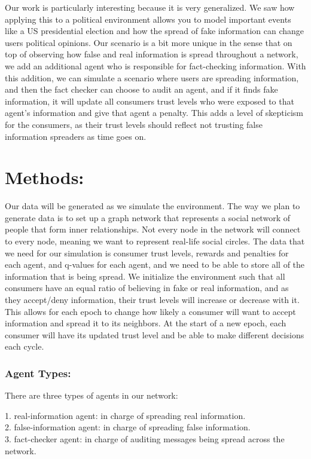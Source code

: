 \documentclass[twoside]{article}
\begin{document}
Our work is particularly interesting because it is very generalized. We saw how applying this to a political environment allows you to model important events like a US presidential election and how the spread of fake information can change users political opinions. Our scenario is a bit more unique in the sense that on top of observing how false and real information is spread throughout a network, we add an additional agent who is responsible for fact-checking information. With this addition, we can simulate a scenario where users are spreading information, and then the fact checker can choose to audit an agent, and if it finds fake information, it will update all consumers trust levels who were exposed to that agent's information and give that agent a penalty. This adds a level of skepticism for the consumers, as their trust levels should reflect not trusting false information spreaders as time goes on.

\section{Methods: }
Our data will be generated as we simulate the environment. The way we plan to generate data is to set up a graph network that represents a social network of people that form inner relationships. Not every node in the network will connect to every node, meaning we want to represent real-life social circles. The data that we need for our simulation is consumer trust levels, rewards and penalties for each agent, and q-values for each agent, and we need to be able to store all of the information that is being spread. We initialize the environment such that all consumers have an equal ratio of believing in fake or real information, and as they accept/deny information, their trust levels will increase or decrease with it. This allows for each epoch to change how likely a consumer will want to accept information and spread it to its neighbors. At the start of a new epoch, each consumer will have its updated trust level and be able to make different decisions each cycle.

\subsubsection{Agent Types:}
There are three types of agents in our network:

1. real-information agent: in charge of spreading real information.\\
2. false-information agent: in charge of spreading false information.\\
3. fact-checker agent: in charge of auditing messages being spread across the network.\\
\end{document}
